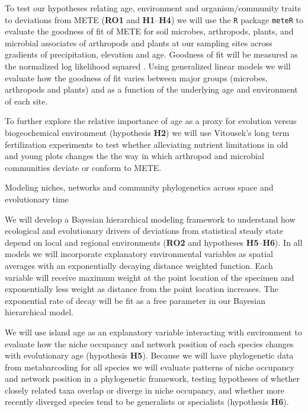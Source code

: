 \documentclass[11pt]{article}
\makeatletter
\renewcommand{\paragraph}{\@startsection{paragraph}{4}{\z@}
  {1ex \@plus 1ex \@minus .2ex}{-1em}
  {\normalfont\normalsize\it}
}
\makeatother
\begin{document}
To test our hypotheses relating age, environment and
organism/community traits to deviations from METE ({\bf RO1} and {\bf
  H1}--{\bf H4}) we will use the {\tt R} package {\tt meteR}
\citep[developed by Rominger][]{rominger2016} to evaluate the goodness
of fit of METE for soil microbes, arthropods, plants, and microbial
associates of arthropods and plants at our sampling sites across
gradients of precipitation, elevation and age.  Goodness of fit will
be measured as the normalized log likelihood squared \citep[described
in][]{rominger2016}. Using generalized linear models we will evaluate
how the goodness of fit varies between major groups (microbes,
arthropods and plants) and as a function of the underlying age and
environment of each site.

To further explore the relative importance of age as a proxy for
evolution versus biogeochemical environment (hypothesis {\bf H2}) we will
use Vitousek's long term fertilization experiments \citep[see letter
of collaboration;][]{vitousek1997nutrient} to test whether alleviating
nutrient limitations in old and young plots changes the the way in
which arthropod and microbial communities deviate or conform to METE.


\paragraph{Modeling niches, networks and community phylogenetics
  across space and evolutionary time}

We will develop a Bayesian hierarchical modeling framework to
understand how ecological and evolutionary drivers of deviations from
statistical steady state depend on local and regional environments
({\bf RO2} and hypotheses {\bf H5}--{\bf H6}).  In all models we will
incorporate explanatory environmental variables as spatial averages
with an exponentially decaying distance weighted function.  Each
variable will receive maximum weight at the point location of the
specimen and exponentially less weight as distance from the point
location increases.  The exponential rate of decay will be fit as a
free parameter in our Bayesian hierarchical model.

We will use island age as an explanatory variable interacting with
environment to evaluate how the niche occupancy and network position
of each species changes with evolutionary age (hypothesis {\bf H5}).
Because we will have phylogenetic data from metabarcoding for all
species we will evaluate patterns of niche occupancy and network
position in a phylogenetic framework, testing hypotheses of whether
closely related taxa overlap or diverge in niche occupancy, and
whether more recently diverged species tend to be generalists or
specialists (hypothesis {\bf H6}).
\end{document}

